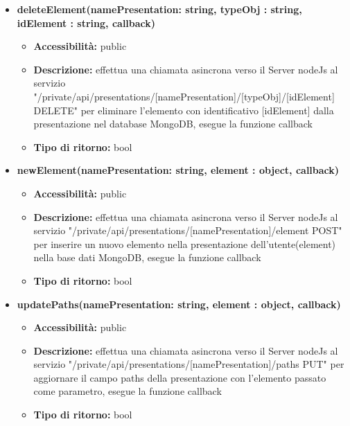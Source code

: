 {{\begin{itemize}
		\item \textbf{deleteElement(namePresentation: string, typeObj : string, idElement : string, callback) }
			\begin{itemize}
			\item \textbf{Accessibilit\`{a}:} public
			\item \textbf{Descrizione:} effettua una chiamata asincrona verso il Server nodeJs al servizio "/private/api/presentations/[namePresentation]/[typeObj]/[idElement] DELETE" per eliminare l'elemento con identificativo [idElement] dalla presentazione nel database MongoDB, esegue la funzione callback
			\item \textbf{Tipo di ritorno:} bool
			\end{itemize}
			
		\item \textbf{newElement(namePresentation: string, element : object, callback)}
			\begin{itemize}
			\item \textbf{Accessibilit\`{a}:} public
			\item \textbf{Descrizione:} effettua una chiamata asincrona verso il Server nodeJs al servizio "/private/api/presentations/[namePresentation]/element POST" per inserire un nuovo elemento nella presentazione dell'utente(element) nella base dati MongoDB, esegue la funzione callback
 			\item \textbf{Tipo di ritorno:} bool
			\end{itemize}
			
		\item \textbf{updatePaths(namePresentation: string, element : object, callback) }
			\begin{itemize}
			\item \textbf{Accessibilit\`{a}:} public
			\item \textbf{Descrizione:} effettua una chiamata asincrona verso il Server nodeJs al servizio "/private/api/presentations/[namePresentation]/paths PUT" per aggiornare il campo paths della presentazione con l'elemento passato come parametro, esegue la funzione callback
			\item \textbf{Tipo di ritorno:} bool
			\end{itemize}

		\end{itemize}
	}
}
	
	
	
	
	
	
	
	
	
	
	
	
	
	
	